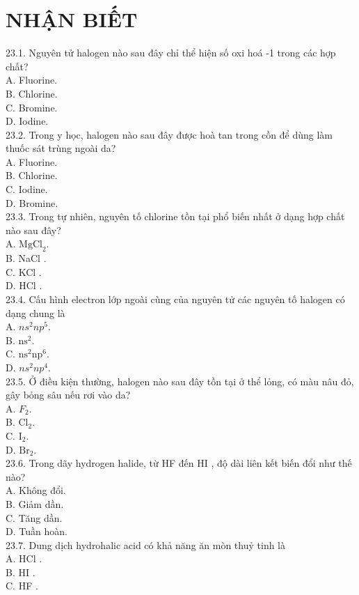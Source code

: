 \documentclass[10pt]{article}
\begin{document}
\section*{NHẬN BIẾT}
23.1. Nguyên tử halogen nào sau đây chỉ thể hiện số oxi hoá -1 trong các hợp chất?\\
A. Fluorine.\\
B. Chlorine.\\
C. Bromine.\\
D. Iodine.\\
23.2. Trong y học, halogen nào sau đây được hoà tan trong cồn để dùng làm thuốc sát trùng ngoài da?\\
A. Fluorine.\\
B. Chlorine.\\
C. Iodine.\\
D. Bromine.\\
23.3. Trong tự nhiên, nguyên tố chlorine tồn tại phổ biến nhất ở dạng hợp chất nào sau đây?\\
A. $\mathrm{MgCl}_{2}$.\\
B. NaCl .\\
C. KCl .\\
D. HCl .\\
23.4. Cấu hình electron lớp ngoài cùng của nguyên tử các nguyên tố halogen có dạng chung là\\
A. $n s^{2} n p^{5}$.\\
B. $\mathrm{ns}^{2}$.\\
C. $\mathrm{ns}^{2} \mathrm{np}^{6}$.\\
D. $n s^{2} n p^{4}$.\\
23.5. Ở điều kiện thường, halogen nào sau đây tồn tại ở thể lỏng, có màu nâu đỏ, gây bỏng sâu nếu rơi vào da?\\
A. $F_{2}$.\\
B. $\mathrm{Cl}_{2}$.\\
C. $\mathrm{I}_{2}$.\\
D. $\mathrm{Br}_{2}$.\\
23.6. Trong dãy hydrogen halide, từ HF đến HI , độ dài liên kết biến đổi như thế nào?\\
A. Không đổi.\\
B. Giảm dần.\\
C. Tăng dần.\\
D. Tuần hoàn.\\
23.7. Dung dịch hydrohalic acid có khả năng ăn mòn thuỷ tinh là\\
A. HCl .\\
B. HI .\\
C. HF .\\
\end{document}
